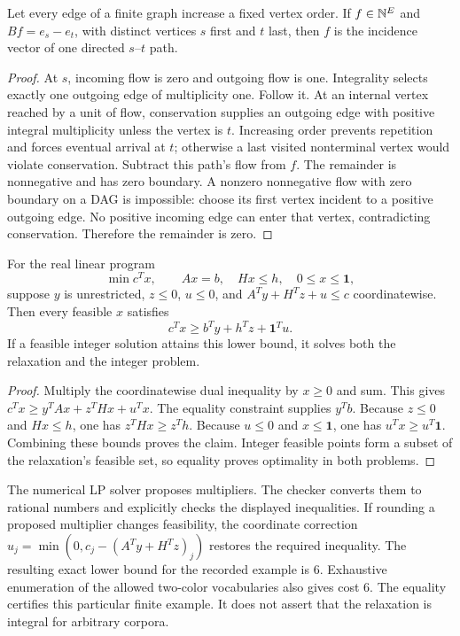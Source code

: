 \begin{lemma}
\label{qt:unit-flow}
Let every edge of a finite graph increase a fixed vertex order. If
$f\in\mathbb{N}^E$ and $Bf=e_s-e_t$, with distinct vertices $s$ first and $t$ last, then $f$ is the
incidence vector of one directed $s$--$t$ path.
\end{lemma}
\begin{proof}
At $s$, incoming flow is zero and outgoing flow is one. Integrality selects
exactly one outgoing edge of multiplicity one. Follow it. At an internal
vertex reached by a unit of flow, conservation supplies an outgoing edge
with positive integral multiplicity unless the vertex is $t$. Increasing
order prevents repetition and forces eventual arrival at $t$; otherwise a
last visited nonterminal vertex would violate conservation. Subtract this
path's flow from $f$. The remainder is nonnegative and has zero boundary.
A nonzero nonnegative flow with zero boundary on a DAG is impossible:
choose its first vertex incident to a positive outgoing edge. No positive
incoming edge can enter that vertex, contradicting conservation. Therefore
the remainder is zero.
\end{proof}

\begin{proposition}
\label{qt:lp-dual}
For the real linear program
\[
 \min c^T x,\qquad Ax=b,\quad Hx\leq h,\quad 0\leq x\leq\mathbf1,
\]
suppose $y$ is unrestricted, $z\leq0$, $u\leq0$, and
$A^T y+H^Tz+u\leq c$ coordinatewise. Then every feasible $x$ satisfies
\[
 c^Tx\geq b^Ty+h^Tz+\mathbf1^Tu.
\]
If a feasible integer solution attains this lower bound, it solves both
the relaxation and the integer problem.
\end{proposition}
\begin{proof}
Multiply the coordinatewise dual inequality by $x\geq0$ and sum. This gives
$c^Tx\geq y^TAx+z^THx+u^Tx$. The equality constraint supplies $y^Tb$.
Because $z\leq0$ and $Hx\leq h$, one has $z^THx\geq z^Th$.
Because $u\leq0$ and $x\leq\mathbf1$, one has $u^Tx\geq u^T\mathbf1$.
Combining these bounds proves the claim. Integer feasible points form a
subset of the relaxation's feasible set, so equality proves optimality in
both problems.
\end{proof}

The numerical LP solver proposes multipliers. The checker converts them
to rational numbers and explicitly checks the displayed inequalities.
If rounding a proposed multiplier changes feasibility, the coordinate
correction
$u_j=\min(0,c_j-(A^Ty+H^Tz)_j)$ restores the required inequality.
The resulting exact lower bound for the recorded example is $6$.
Exhaustive enumeration of the allowed two-color vocabularies also gives
cost $6$. The equality certifies this particular finite example. It does
not assert that the relaxation is integral for arbitrary corpora.

